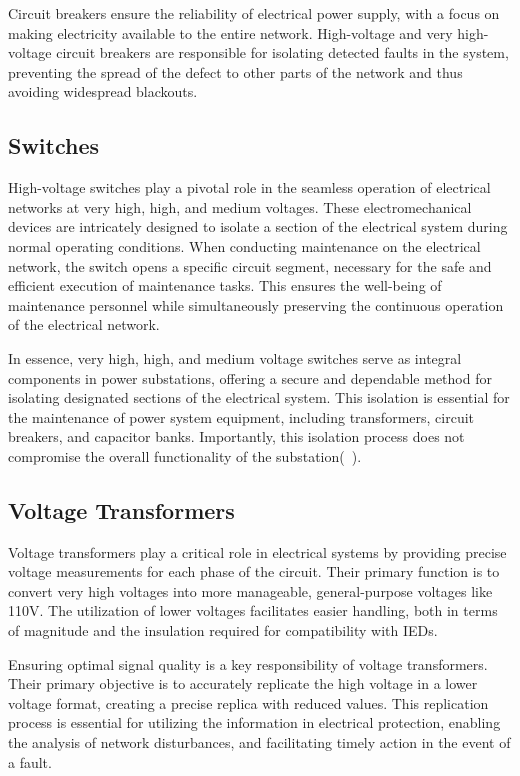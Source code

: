 Circuit breakers ensure the reliability of electrical power supply, with a focus on making electricity available to the entire network. High-voltage and very high-voltage circuit breakers are responsible for isolating detected faults in the system, preventing the spread of the defect to other parts of the network and thus avoiding widespread blackouts.

\subsection{Switches}
High-voltage switches play a pivotal role in the seamless operation of electrical networks at very high, high, and medium voltages. These electromechanical devices are intricately designed to isolate a section of the electrical system during normal operating conditions. When conducting maintenance on the electrical network, the switch opens a specific circuit segment, necessary for the safe and efficient execution of maintenance tasks. This ensures the well-being of maintenance personnel while simultaneously preserving the continuous operation of the electrical network.

In essence, very high, high, and medium voltage switches serve as integral components in power substations, offering a secure and dependable method for isolating designated sections of the electrical system. This isolation is essential for the maintenance of power system equipment, including transformers, circuit breakers, and capacitor banks. Importantly, this isolation process does not compromise the overall functionality of the substation(~\cite{janne2013switchgear}).

\subsection{Voltage Transformers}
Voltage transformers play a critical role in electrical systems by providing precise voltage measurements for each phase of the circuit. Their primary function is to convert very high voltages into more manageable, general-purpose voltages like 110V. The utilization of lower voltages facilitates easier handling, both in terms of magnitude and the insulation required for compatibility with IEDs.

Ensuring optimal signal quality is a key responsibility of voltage transformers. Their primary objective is to accurately replicate the high voltage in a lower voltage format, creating a precise replica with reduced values. This replication process is essential for utilizing the information in electrical protection, enabling the analysis of network disturbances, and facilitating timely action in the event of a fault.


